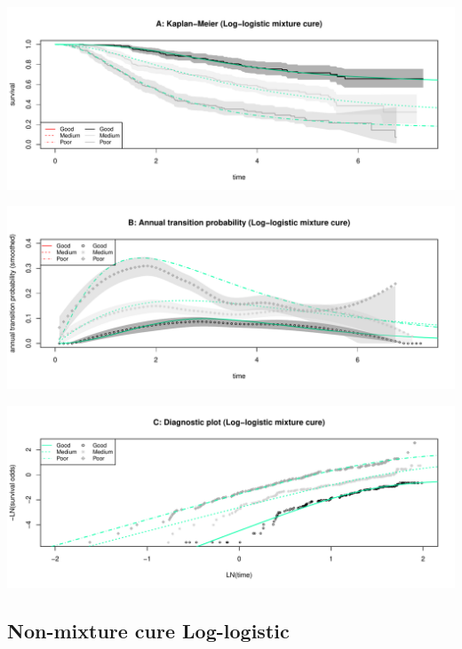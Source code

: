 \documentclass[]{article}
\begin{document}
\begin{flushleft}\includegraphics[height=0.25\textheight]{Images/cure_llog_mix-1} \end{flushleft}

\begin{flushleft}\includegraphics[height=0.25\textheight]{Images/cure_llog_mix-2} \end{flushleft}

\begin{flushleft}\includegraphics[height=0.25\textheight]{Images/cure_llog_mix-3} \end{flushleft}

\newpage

\subsection{Non-mixture cure
Log-logistic}\label{non-mixture-cure-log-logistic}
\end{document}
